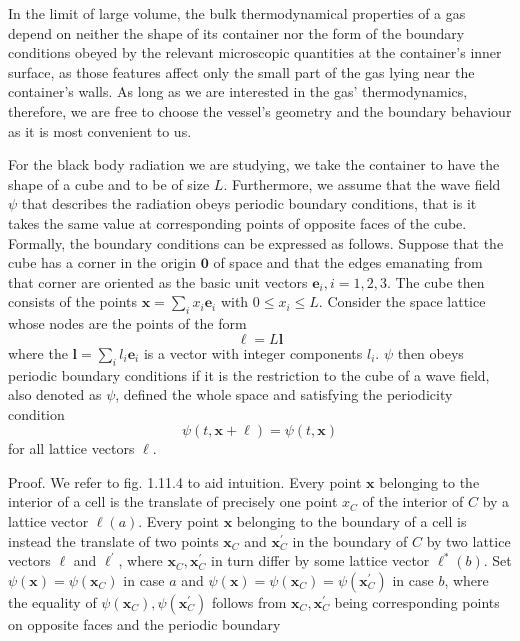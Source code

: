 \documentclass{article}
\begin{document}
In the limit of large volume, the bulk thermodynamical properties of a gas depend on neither the shape of its container nor the form of the boundary conditions
obeyed by the relevant microscopic quantities at the container's inner surface, as those features affect only the small part of the gas lying near the container's walls. As long as we are interested in the gas' thermodynamics, therefore, we are free to choose the vessel's geometry and the boundary behaviour as it is most convenient to us.

For the black body radiation we are studying, we take the container to have the shape of a cube and to be of size $L$. Furthermore, we assume that the wave field $\psi$ that describes the radiation obeys periodic boundary conditions, that is it takes the same value at corresponding points of opposite faces of the cube. Formally, the boundary conditions can be expressed as follows. Suppose that the cube has a corner in the origin $\mathbf{0}$ of space and that the edges emanating from that corner are oriented as the basic unit vectors $\boldsymbol{e}_{i}, i=1,2,3$. The cube then consists of the points $\boldsymbol{x}=\sum_{i} x_{i} \boldsymbol{e}_{i}$ with $0 \leq x_{i} \leq L$. Consider the space lattice whose nodes are the points of the form
$$
\begin{equation*}
\boldsymbol{\ell}=L \boldsymbol{l} \tag{1.11.31}
\end{equation*}
$$
where the $\boldsymbol{l}=\sum_{i} l_{i} \boldsymbol{e}_{i}$ is a vector with integer components $l_{i}$. $\psi$ then obeys periodic boundary conditions if it is the restriction to the cube of a wave field, also denoted as $\psi$, defined the whole space and satisfying the periodicity condition
$$
\begin{equation*}
\psi(t, \boldsymbol{x}+\boldsymbol{\ell})=\psi(t, \boldsymbol{x}) \tag{1.11.32}
\end{equation*}
$$
for all lattice vectors $\boldsymbol{\ell}$.

Proof. We refer to fig. 1.11.4 to aid intuition. Every point $\boldsymbol{x}$ belonging to the interior of a cell is the translate of precisely one point $x_{C}$ of the interior of $C$ by a lattice vector $\boldsymbol{\ell}(a)$. Every point $\boldsymbol{x}$ belonging to the boundary of a cell is instead the translate of two points $\boldsymbol{x}_{C}$ and $\boldsymbol{x}_{C}^{\prime}$ in the boundary of $C$ by two lattice vectors $\boldsymbol{\ell}$ and $\boldsymbol{\ell}^{\prime}$, where $\boldsymbol{x}_{C}, \boldsymbol{x}_{C}^{\prime}$ in turn differ by some lattice vector $\boldsymbol{\ell}^{*}(b)$. Set $\psi(\boldsymbol{x})=\psi\left(\boldsymbol{x}_{C}\right)$ in case $a$ and $\psi(\boldsymbol{x})=\psi\left(\boldsymbol{x}_{C}\right)=\psi\left(\boldsymbol{x}_{C}^{\prime}\right)$ in case $b$, where the equality of $\psi\left(\boldsymbol{x}_{C}\right), \psi\left(\boldsymbol{x}_{C}^{\prime}\right)$ follows from $\boldsymbol{x}_{C}, \boldsymbol{x}_{C}^{\prime}$ being corresponding points on opposite faces and the periodic boundary
\end{document}
